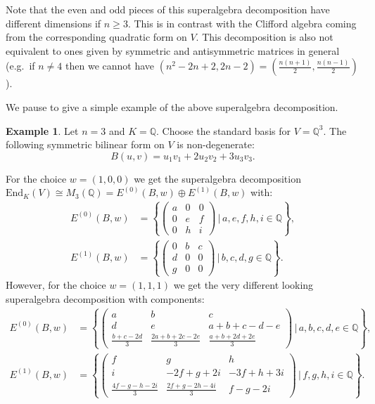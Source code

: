 \documentclass{amsart}
\theoremstyle{plain}
\theoremstyle{definition}
\newtheorem{eg}[theorem]{Example}
\begin{document}
Note that the even and odd pieces of this superalgebra decomposition have different dimensions if $n\geq 3$. This is in contrast with the Clifford algebra coming from the corresponding quadratic form on $V$. This decomposition is also not equivalent to ones given by symmetric and antisymmetric matrices in general (e.g.\ if $n\neq 4$ then we cannot have $(n^2-2n+2, 2n-2) = \left(\frac{n(n+1)}{2},\frac{n(n-1)}{2}\right)$).

We pause to give a simple example of the above superalgebra decomposition.

\begin{eg}
Let $n=3$ and $K = \mathbb{Q}$. Choose the standard basis for $V = \mathbb{Q}^3$. The following symmetric bilinear form on $V$ is non-degenerate: \[B(u,v) = u_1v_1 + 2u_2v_2 + 3u_3v_3.\]

For the choice $w = (1,0,0)$ we get the superalgebra decomposition $\text{End}_K(V)\cong M_3(\mathbb{Q}) = E^{(0)}(B,w)\oplus E^{(1)}(B,w)$ with: \begin{align*}E^{(0)}(B,w) &= \left\{\begin{pmatrix}a & 0 & 0\\ 0 & e & f\\ 0 & h & i\end{pmatrix}\,\Bigg|\, a,e,f,h,i\in\mathbb{Q}\right\},\\ E^{(1)}(B,w) &= \left\{\begin{pmatrix}0 & b & c\\ d & 0 & 0\\ g & 0 & 0\end{pmatrix}\,\Bigg|\, b,c,d,g\in\mathbb{Q}\right\}.\end{align*} However, for the choice $w=(1,1,1)$ we get the very different looking superalgebra decomposition with components: \begin{align*}E^{(0)}(B,w) &= \left\{\begin{pmatrix}a & b & c\\ d & e & a + b + c - d - e\\ \frac{b+c-2d}{3} & \frac{2a + b + 2c - 2e}{3} & \frac{a + b + 2d + 2e}{3}\end{pmatrix}\,\Bigg|\, a,b,c,d,e\in\mathbb{Q} \right\}, \\ E^{(1)}(B,w) &= \left\{\begin{pmatrix}f & g& h\\ i & -2f + g + 2i & -3f + h + 3i \\ \frac{4f - g - h - 2i}{3} & \frac{2f + g - 2h - 4i}{3} & f - g - 2i\end{pmatrix}\,\Bigg|\, f,g,h,i\in\mathbb{Q}\right\}.\end{align*}
\end{eg}
\end{document}
